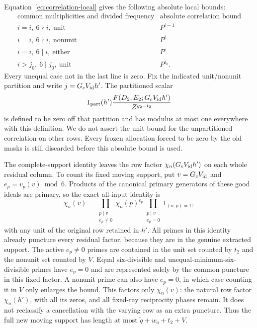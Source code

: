 \documentclass[11pt,a4paper]{article}
\numberwithin{equation}{section}
\numberwithin{figure}{section}
\theoremstyle{definition}
\theoremstyle{remark}
\begin{document}
Equation~\eqref{eq:correlation-local} gives the following absolute
local bounds:
\[
 \begin{array}{c|c}
 \text{common multiplicities and divided frequency}&
       \text{absolute correlation bound}\\ \hline
 i=i,\ 6\nmid i,\ \text{unit}&P^{i-1}\\
 i=i,\ 6\nmid i,\ \text{nonunit}&P^i\\
 i=i,\ 6\mid i,\ \text{either}&P^i\\
 i>j_0,\ 6\mid j_0,\ \text{unit}&P^{j_0}.
 \end{array}
\]
Every unequal case not in the last line is zero.  Fix the indicated
unit/nonunit partition and write \(j=G_cV_{\rm id}h'\).  The
partitioned scalar
\[
 1_{\rm part}(h')
 \frac{F(D_2,E_2;G_cV_{\rm id}h')}{Z^{g_2-t_2}}
\]
is defined to be zero off that partition and has modulus at most one
everywhere with this definition.  We do not assert the unit bound for
the unpartitioned correlation on other rows.  Every frozen allocation
forced to be zero by the old masks is still discarded before this
absolute bound is used.

The complete-support identity leaves the row factor
\(\chi_n(G_cV_{\rm id}h')\) on each whole residual column.
To count its fixed moving support, put \(v=G_cV_{\rm id}\) and
\(e_p=v_p(v)\bmod 6\).  Products of the canonical primary
generators of these good ideals are primary, so the exact all-input
identity is
\[
 \chi_n(v)=
   \prod_{\substack{p\mid v\\e_p\ne0}}\chi_n(p)^{e_p}
   \prod_{\substack{p\mid v\\e_p=0}}1_{(n,p)=1},
\]
with any unit of the original row retained in \(h'\).  All primes in this identity
already puncture every residual factor, because they are in the
genuine extracted support.  The active \(e_p\ne0\) primes are
contained in the unit set counted by \(t_2\) and the nonunit set
counted by \(V\).  Equal six-divisible and unequal-minimum-six-divisible
primes have \(e_p=0\) and are represented solely by the common
puncture in this fixed factor.  A nonunit prime can also have
\(e_p=0\), in which case counting it in \(V\) only enlarges the
bound.  This factors only \(\chi_n(v)\): the natural row factor
\(\chi_n(h')\), with all its zeros, and all fixed-ray reciprocity
phases remain.  It does not reclassify a cancellation with the
varying row as an extra puncture.  Thus the full new moving support
has length at most \(\widetilde q+w_o+t_2+V\).
\end{document}
